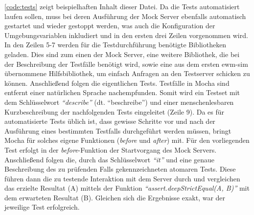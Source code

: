 \autoref{code:tests} zeigt beispielhaften Inhalt dieser Datei.
Da die Tests automatisiert laufen sollen, muss bei deren Ausführung der Mock Server ebenfalls automatisch gestartet und wieder gestoppt werden, was auch die Konfiguration der Umgebungsvariablen inkludiert und in den ersten drei Zeilen vorgenommen wird.
In den Zeilen 5-7 werden für die Testdurchführung benötigte Bibliotheken geladen.
Dies sind zum einen der Mock Server, eine weitere Bibliothek, die bei der Beschreibung der Testfälle benötigt wird, sowie eine aus dem ersten \ac{ewm-sim} übernommene Hilfsbibliothek, um einfach Anfragen an den Testserver schicken zu können.
Anschließend folgen die eigentlichen Tests.
Testfälle in Mocha sind entfernt einer natürlichen Sprache nachempfunden.
Somit wird ein Testset mit dem Schlüsselwort \emph{\enquote{describe}} (dt. \enquote{beschreibe}) und einer menschenlesbaren Kurzbeschreibung der nachfolgenden Tests eingeleitet (Zeile 9).
Da es für automatisierte Tests üblich ist, dass gewisse Schritte vor und nach der Ausführung eines bestimmten Testfalls durchgeführt werden müssen, bringt Mocha für solches eigene Funktionen (\emph{before} und \emph{after}) mit.
Für den vorliegenden Test erfolgt in der \emph{before}-Funktion der Startvorgang des Mock Servers.
Anschließend folgen die, durch das Schlüsselwort \emph{\enquote{it}} und eine genaue Beschreibung des zu prüfenden Falls gekennzeichneten atomaren Tests.
Diese führen dann die zu testende Interaktion mit dem Server durch und vergleichen das erzielte Resultat (A) mittels der Funktion \emph{\enquote{assert.deepStrictEqual(A, B)}} mit dem erwarteten Resultat (B).
Gleichen sich die Ergebnisse exakt, war der jeweilige Test erfolgreich.




